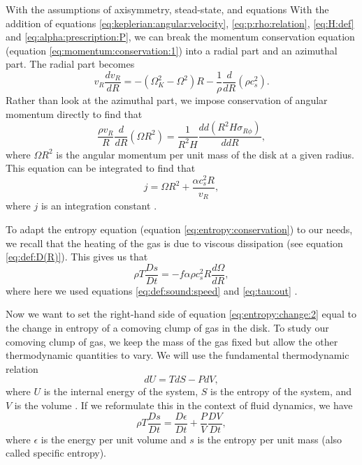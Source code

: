 \documentclass[]{article}
\newcommand{\diff}[2]{\frac{d #1}{d #2}}
\newcommand{\dR}[1]{\frac{d #1}{dR}}
\newcommand{\ddR}{\frac{d}{dR}}
\newcommand{\Dt}[1]{\frac{D #1}{Dt}}
\begin{document}
With the assumptions of axisymmetry, stead-state, and equations With
the addition of equations \eqref{eq:keplerian:angular:velocity},
\eqref{eq:p:rho:relation}, \eqref{eq:H:def} and
\eqref{eq:alpha:prescription:P}, we can break the momentum
conservation equation (equation \eqref{eq:momentum:conservation:1})
into a radial part and an azimuthal part. The radial part becomes
\cite{Shafee08}
\begin{equation}
  \label{eq:radial:momentum}
  v_R \dR{v_R} = - (\Omega_K^2 - \Omega^2)R - \frac{1}{\rho}\ddR(\rho c_s^2).
\end{equation}
Rather than look at the azimuthal part, we impose conservation of
angular momentum directly to find that \cite{Shafee08}
\begin{equation}
  \label{eq:angular:momentum:conservation}
  \frac{\rho v_R}{R} \ddR (\Omega R^2) =  \frac{1}{R^2 H} \diff{d(R^2 H \sigma_{R\phi})}{dR},
\end{equation}
where $\Omega R^2$ is the angular momentum per unit mass of the disk at
a given radius. This equation can be integrated to find that
\begin{equation}
  \label{eq:integrated:angular:momentum}
  j = \Omega R^2 + \frac{\alpha c_s^2 R}{v_R},
\end{equation}
where $j$ is an integration constant \cite{Shafee08}. 

To adapt the entropy equation (equation
\eqref{eq:entropy:conservation}) to our needs, we recall that the
heating of the gas is due to viscous dissipation (see equation
\eqref{eq:def:D(R)}). This gives us that
\begin{equation}
  \label{eq:entropy:change:2}
  \rho T \Dt{s} = - f \alpha \rho c_s^2 R \dR{\Omega},
\end{equation}
where here we used equations \eqref{eq:def:sound:speed} and
\eqref{eq:tau:out} \cite{Shafee08}.

Now we want to set the right-hand side of equation
\eqref{eq:entropy:change:2} equal to the change in entropy of a
comoving clump of gas in the disk.  To study our comoving clump of
gas, we keep the mass of the gas fixed but allow the other
thermodynamic quantities to vary. We will use the fundamental
thermodynamic relation
\begin{equation}
  \label{eq:fundamental:thermodynamic:relation}
  dU = T dS - P dV,
\end{equation}
where $U$ is the internal energy of the system, $S$ is the entropy of
the system, and $V$ is the volume \cite{Schroeder}. If we reformulate
this in the context of fluid dynamics, we have
\begin{equation}
  \label{eq:fundamental:thermodynamic:relation:fluids}
  \rho T \Dt{s} = \Dt{\epsilon} + \frac{P}{V} \Dt{V},
\end{equation}
where $\epsilon$ is the energy per unit volume and $s$ is the entropy
per unit mass (also called specific entropy).
\end{document}
